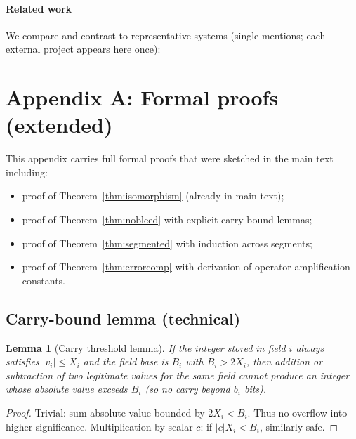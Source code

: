 \documentclass[11pt]{article}
\theoremstyle{definition}
\theoremstyle{plain}
\newtheorem{lemma}{Lemma}[section]
\begin{document}
\paragraph{Related work}
We compare and contrast to representative systems (single mentions; each external project appears here once):

\appendix

\section{Appendix A: Formal proofs (extended)}
This appendix carries full formal proofs that were sketched in the main text including:
\begin{itemize}
  \item proof of Theorem~\ref{thm:isomorphism} (already in main text);
  \item proof of Theorem~\ref{thm:nobleed} with explicit carry-bound lemmas;
  \item proof of Theorem~\ref{thm:segmented} with induction across segments;
  \item proof of Theorem~\ref{thm:errorcomp} with derivation of operator amplification constants.
\end{itemize}

\subsection{Carry-bound lemma (technical)}
\begin{lemma}[Carry threshold lemma]
If the integer stored in field \(i\) always satisfies \(|v_i| \le X_i\) and the field base is \(B_i\) with \(B_i > 2X_i\), then addition or subtraction of two legitimate values for the same field cannot produce an integer whose absolute value exceeds \(B_i\) (so no carry beyond \(b_i\) bits).
\end{lemma}
\begin{proof}
Trivial: sum absolute value bounded by \(2X_i < B_i\). Thus no overflow into higher significance. Multiplication by scalar \(c\): if \(|c| X_i < B_i\), similarly safe.
\end{proof}
\end{document}
